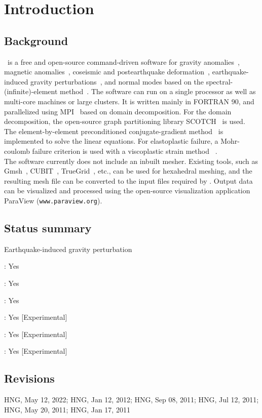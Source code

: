 
\chapter{Introduction}
\section{Background}

\pack\ is a free and open-source command-driven software for gravity anomalies~\citep{gharti2018}, magnetic anomalies~\citep{gharti2019c}, coseismic and postearthquake deformation~\citep{gharti2019a}, earthquake-induced gravity perturbations~\citep{gharti2019b}, and normal modes based on the spectral-(infinite)-element method~\citep[e.g.,][]{patera1984,canuto1988,seriani1994,faccioli1997,komatitsch1998,komatitsch1999,peter2011,gharti2017a}. The software can run on a single processor as well as multi-core machines or large clusters. It is written mainly in FORTRAN 90, and parallelized using
MPI~\citep{gropp1994,pacheco1997} based on domain decomposition. For the domain decomposition, the open-source graph partitioning library SCOTCH~\citep{pellegrini1996} is used. The element-by-element preconditioned conjugate-gradient method~\citep[e.g.,][]{hughes1983,law1986,king1987,barragy1988} is implemented to solve the linear equations. For elastoplastic failure,
a Mohr-coulomb failure criterion is used with a viscoplastic strain method~ \citep{zienkiewicz1974}.\\

The software currently does not include an inbuilt mesher. Existing tools, such as Gmsh~\citep{geuzaine2009}, CUBIT~\citep{cubit2011}, TrueGrid~\citep{truegrid2006}, etc., can be used for hexahedral meshing, and the resulting mesh file can be converted to the input files required by \pack. Output data can be visualized and processed using the open-source visualization application ParaView (\texttt{www.paraview.org}).

\section{Status summary}
\begin{desclist}{Earthquake-induced gravity perturbation}
\item[Gravity anomalies]        : Yes
\item[Magnetic anomalies]           : Yes
\item[Coseismic deformation]                 : Yes
\item[Postearthquake deformation]                 : Yes [Experimental]
\item[Earthquake-induced gravity perturbation]                    : Yes [Experimental]
\item[Frequency-domain method]: Yes [Experimental]
\end{desclist}

\section*{Revisions}

HNG, May 12, 2022; HNG, Jan 12, 2012; HNG, Sep 08, 2011; HNG, Jul 12, 2011; HNG, May 20, 2011; HNG, Jan 17, 2011


